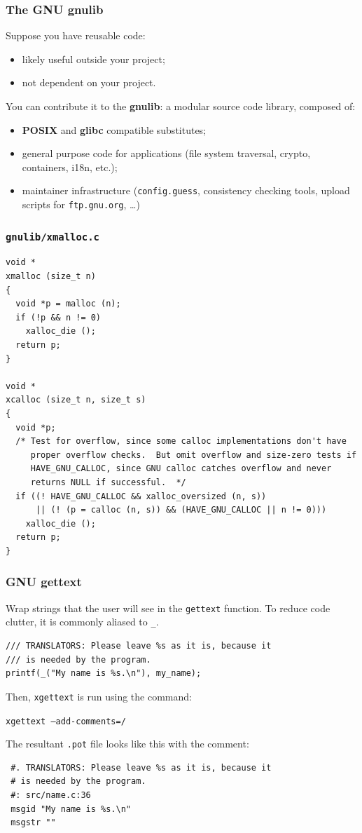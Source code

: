 \documentclass{beamer}
\begin{document}
\begin{frame}
  \frametitle{The GNU gnulib}
  Suppose you have reusable code:
  \begin{itemize}
    \item likely useful outside your project;
    \item not dependent on your project.
  \end{itemize}
  \vfill
  You can contribute it to the \textbf{gnulib}: a modular source code library,
  composed of:
    \begin{itemize}
      \item \textbf{POSIX} and \textbf{glibc} compatible substitutes;
      \item general purpose code for applications (file system traversal,
        crypto, containers, i18n, etc.);
      \item maintainer infrastructure (\texttt{config.guess}, consistency
        checking tools, upload scripts for \texttt{ftp.gnu.org}, \ldots)
    \end{itemize}
\end{frame}

\begin{frame}[fragile,shrink=25]
  \frametitle{\texttt{gnulib/xmalloc.c}}
\begin{verbatim}
void *
xmalloc (size_t n)
{
  void *p = malloc (n);
  if (!p && n != 0)
    xalloc_die ();
  return p;
}

void *
xcalloc (size_t n, size_t s)
{
  void *p;
  /* Test for overflow, since some calloc implementations don't have
     proper overflow checks.  But omit overflow and size-zero tests if
     HAVE_GNU_CALLOC, since GNU calloc catches overflow and never
     returns NULL if successful.  */
  if ((! HAVE_GNU_CALLOC && xalloc_oversized (n, s))
      || (! (p = calloc (n, s)) && (HAVE_GNU_CALLOC || n != 0)))
    xalloc_die ();
  return p;
}
\end{verbatim}
\end{frame}

\begin{frame}[fragile]
  \frametitle{GNU gettext}
  Wrap strings that the user will see in the \texttt{gettext} function. To reduce code
clutter, it is commonly aliased to \texttt{\_}.

\begin{verbatim}
/// TRANSLATORS: Please leave %s as it is, because it
/// is needed by the program.
printf(_("My name is %s.\n"), my_name);
\end{verbatim}

Then, \texttt{xgettext} is run using the command:

\texttt{xgettext --add-comments=/}

\vfill

The resultant \texttt{.pot} file looks like this with the comment:
\begin{verbatim}
 #. TRANSLATORS: Please leave %s as it is, because it
 # is needed by the program.
 #: src/name.c:36
 msgid "My name is %s.\n"
 msgstr ""
\end{verbatim}
\end{frame}
\end{document}

